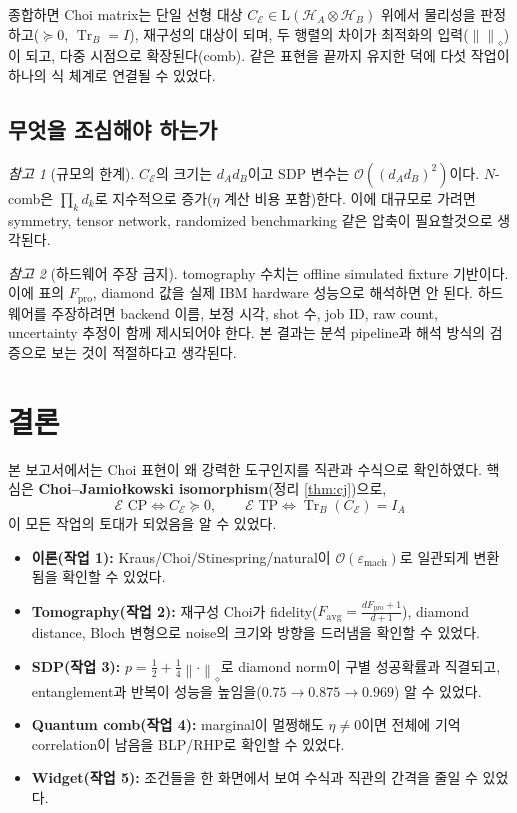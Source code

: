 \documentclass[11pt,a4paper]{article}
\newcommand{\E}{\mathcal{E}}
\newcommand{\Hcal}{\mathcal{H}}
\newcommand{\Tr}{\operatorname{Tr}}
\newcommand{\Lin}{\mathrm{L}}
\newcommand{\diamondnorm}[1]{\left\lVert #1 \right\rVert_{\diamond}}
\theoremstyle{definition}
\theoremstyle{plain}
\theoremstyle{remark}
\newtheorem*{remark}{참고}
\begin{document}
종합하면 Choi matrix는 단일 선형 대상 $C_\E\in\Lin(\Hcal_A\otimes\Hcal_B)$ 위에서 물리성을 판정하고($\succeq0$, $\Tr_B=I$), 재구성의 대상이 되며, 두 행렬의 차이가 최적화의 입력($\diamondnorm{}$)이 되고, 다중 시점으로 확장된다(comb). 같은 표현을 끝까지 유지한 덕에 다섯 작업이 하나의 식 체계로 연결될 수 있었다.

\subsection{무엇을 조심해야 하는가}

\begin{remark}[규모의 한계]
$C_\E$의 크기는 $d_Ad_B$이고 SDP 변수는 $\mathcal O((d_Ad_B)^2)$이다. $N$-comb은 $\prod_k d_k$로 지수적으로 증가($\eta$ 계산 비용 포함)한다. 이에 대규모로 가려면 symmetry, tensor network, randomized benchmarking 같은 압축이 필요할것으로 생각된다.
\end{remark}

\begin{remark}[하드웨어 주장 금지]
tomography 수치는 offline simulated fixture 기반이다. 이에 표의 $F_{\mathrm{pro}}$, diamond 값을 실제 IBM hardware 성능으로 해석하면 안 된다. 하드웨어를 주장하려면 backend 이름, 보정 시각, shot 수, job ID, raw count, uncertainty 추정이 함께 제시되어야 한다. 본 결과는 분석 pipeline과 해석 방식의 검증으로 보는 것이 적절하다고 생각된다.
\end{remark}

\section{결론}

본 보고서에서는 Choi 표현이 왜 강력한 도구인지를 직관과 수식으로 확인하였다. 핵심은 \textbf{Choi--Jamio{\l}kowski isomorphism}(정리 \ref{thm:cj})으로,
\[
\E\text{ CP}\iff C_\E\succeq0,\qquad \E\text{ TP}\iff\Tr_B(C_\E)=I_A
\]
이 모든 작업의 토대가 되었음을 알 수 있었다.

\begin{itemize}
  \item \textbf{이론(작업 1):} Kraus/Choi/Stinespring/natural이 $\mathcal O(\varepsilon_{\mathrm{mach}})$로 일관되게 변환됨을 확인할 수 있었다.
  \item \textbf{Tomography(작업 2):} 재구성 Choi가 fidelity($F_{\mathrm{avg}}=\frac{dF_{\mathrm{pro}}+1}{d+1}$), diamond distance, Bloch 변형으로 noise의 크기와 방향을 드러냄을 확인할 수 있었다.
  \item \textbf{SDP(작업 3):} $p=\tfrac12+\tfrac14\diamondnorm{\cdot}$로 diamond norm이 구별 성공확률과 직결되고, entanglement과 반복이 성능을 높임을($0.75\to0.875\to0.969$) 알 수 있었다.
  \item \textbf{Quantum comb(작업 4):} marginal이 멀쩡해도 $\eta\neq0$이면 전체에 기억 correlation이 남음을 BLP/RHP로 확인할 수 있었다.
  \item \textbf{Widget(작업 5):} 조건들을 한 화면에서 보여 수식과 직관의 간격을 줄일 수 있었다.
\end{itemize}
\end{document}
